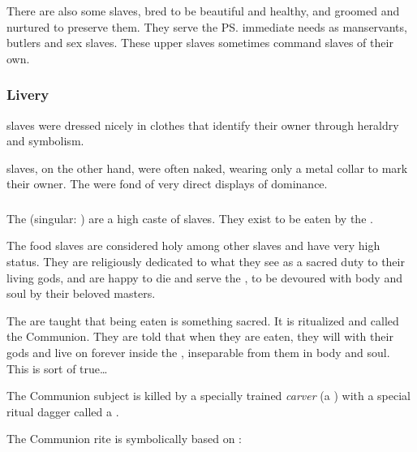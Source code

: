 There are also some  slaves, bred to be beautiful and healthy, and groomed and nurtured to preserve them. They serve the \ps{\resphain}{} immediate needs as manservants, butlers and sex slaves. 
These upper slaves sometimes command slaves of their own. 





\subsubsection{Livery}
\CiriathSepher{} slaves were dressed nicely in clothes that identify their owner through heraldry and symbolism. 

\Mystraacht{} slaves, on the other hand, were often naked, wearing only a metal collar to mark their owner. 
The \Mystraacht{} were fond of very direct displays of dominance. 





\subsubsection{\Naorim}
\index{\naor}
The \naorim{} (singular: \naor) are a high caste of slaves. 
They exist to be eaten by the \resphain. 

The food slaves are considered holy among other slaves and have very high status. 
They are religiously dedicated to what they see as a sacred duty to their living gods, and are happy to die and serve the \resphain{}, to be devoured with body and soul by their beloved masters. 

The \naorim{} are taught that being eaten is something sacred. 
It is ritualized and called the Communion. 
They are told that when they are eaten, they will  with their \resphan{} gods and live on forever inside the \resphain, inseparable from them in body and soul. 
This is sort of true\ldots{}

\index{\gelveir}
The Communion subject is killed by a specially trained \emph{carver} (a \human) with a special ritual dagger called a \gelveir. 

The Communion rite is symbolically based on : 

